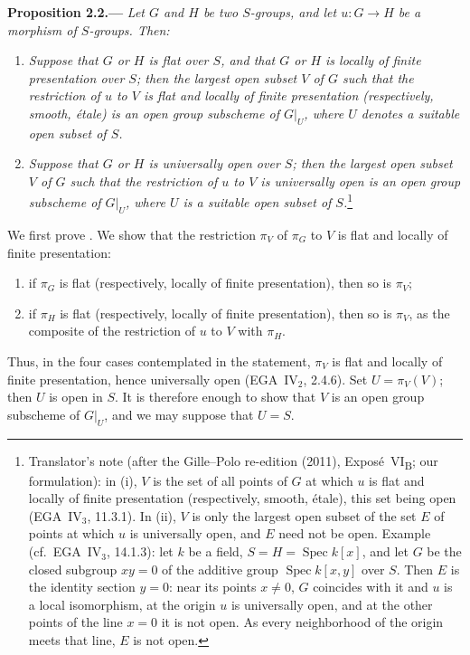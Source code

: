 \medskip
{}\label{prop:sga3-VIB-2.2}%
\noindent\textbf{Proposition 2.2.---}
\emph{Let \(G\) and \(H\) be two \(S\)-groups, and let
\(u:G\to H\) be a morphism of \(S\)-groups. Then:}
\begin{enumerate}
\item[\textup{\SGAInlineRefTarget{prop:sga3-VIB-2.2:item:i}(i)}] \emph{Suppose that \(G\) or \(H\) is flat over
  \(S\), and that \(G\) or \(H\) is locally of finite presentation
  over \(S\); then the largest open subset \(V\) of \(G\) such that
  the restriction of \(u\) to \(V\) is flat and locally of finite
  presentation (respectively, smooth, \'etale) is an open group
  subscheme of \(G|_U\), where \(U\) denotes a suitable open subset
  of \(S\).}
\item[\textup{\SGAInlineRefTarget{prop:sga3-VIB-2.2:item:ii}(ii)}] \emph{Suppose that \(G\) or \(H\) is
  universally open over \(S\); then the largest open subset \(V\) of
  \(G\) such that the restriction of \(u\) to \(V\) is universally
  open is an open group subscheme of \(G|_U\), where \(U\) is a
  suitable open subset of \(S\).}\footnote{Translator's note (after the Gille--Polo re-edition (2011), Expos\'e~VI\textsubscript{B}; our
formulation): in (i), \(V\) is the set of all points of \(G\) at which \(u\) is flat and locally of finite
presentation (respectively, smooth, \'etale), this set being open (EGA~IV\(_3\), 11.3.1). In (ii), \(V\) is
only the largest open subset of the set \(E\) of points at which \(u\) is universally open, and \(E\) need
not be open. Example (cf.\ EGA~IV\(_3\), 14.1.3): let \(k\) be a field, \(S=H=\operatorname{Spec}k[x]\), and
let \(G\) be the closed subgroup \(xy=0\) of the additive group \(\operatorname{Spec}k[x,y]\) over \(S\).
Then \(E\) is the identity section \(y=0\): near its points \(x\neq0\), \(G\) coincides with it and
\(u\) is a local isomorphism, at the origin \(u\) is universally open, and at the other points of the
line \(x=0\) it is not open. As every neighborhood of the origin meets that line, \(E\) is not open.}
\end{enumerate}

We first prove \textup{}. We show that the restriction
\(\pi_V\) of \(\pi_G\) to \(V\) is flat and locally of finite
presentation:
\begin{enumerate}
\item[\textup{a)}] if \(\pi_G\) is flat (respectively, locally of
  finite presentation), then so is \(\pi_V\);
\item[\textup{b)}] if \(\pi_H\) is flat (respectively, locally of
  finite presentation), then so is \(\pi_V\), as the composite of
  the restriction of \(u\) to \(V\) with \(\pi_H\).
\end{enumerate}
Thus, in the four cases contemplated in the statement, \(\pi_V\)
is flat and locally of finite presentation, hence universally open
(EGA~IV\(_2\), 2.4.6). Set \(U=\pi_V(V)\); then \(U\) is open in
\(S\). It is therefore enough to show that \(V\) is an open group
subscheme of \(G|_U\), and we may suppose that \(U=S\).

